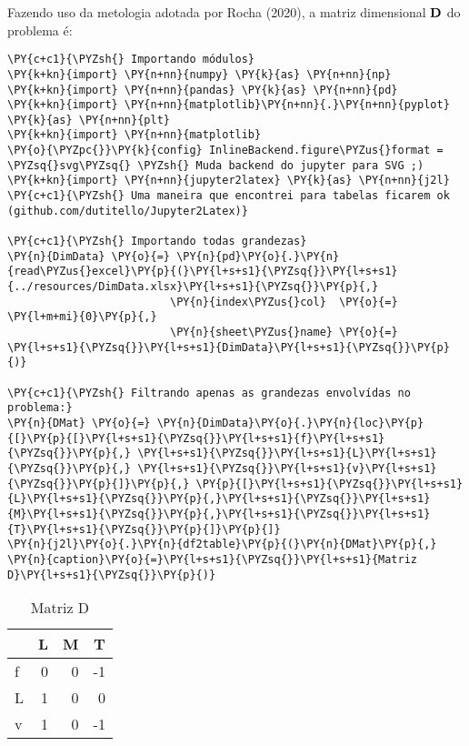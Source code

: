     Fazendo uso da metologia adotada por Rocha (2020), a matriz dimensional
\(\bf D\) do problema é:

    \begin{tcolorbox}[breakable, size=fbox, boxrule=1pt, pad at break*=1mm,colback=cellbackground, colframe=cellborder]
\begin{Verbatim}[commandchars=\\\{\}]
\PY{c+c1}{\PYZsh{} Importando módulos}
\PY{k+kn}{import} \PY{n+nn}{numpy} \PY{k}{as} \PY{n+nn}{np}
\PY{k+kn}{import} \PY{n+nn}{pandas} \PY{k}{as} \PY{n+nn}{pd} 
\PY{k+kn}{import} \PY{n+nn}{matplotlib}\PY{n+nn}{.}\PY{n+nn}{pyplot} \PY{k}{as} \PY{n+nn}{plt}
\PY{k+kn}{import} \PY{n+nn}{matplotlib}
\PY{o}{\PYZpc{}}\PY{k}{config} InlineBackend.figure\PYZus{}format = \PYZsq{}svg\PYZsq{} \PYZsh{} Muda backend do jupyter para SVG ;)
\PY{k+kn}{import} \PY{n+nn}{jupyter2latex} \PY{k}{as} \PY{n+nn}{j2l} \PY{c+c1}{\PYZsh{} Uma maneira que encontrei para tabelas ficarem ok (github.com/dutitello/Jupyter2Latex)}

\PY{c+c1}{\PYZsh{} Importando todas grandezas}
\PY{n}{DimData} \PY{o}{=} \PY{n}{pd}\PY{o}{.}\PY{n}{read\PYZus{}excel}\PY{p}{(}\PY{l+s+s1}{\PYZsq{}}\PY{l+s+s1}{../resources/DimData.xlsx}\PY{l+s+s1}{\PYZsq{}}\PY{p}{,} 
                         \PY{n}{index\PYZus{}col}  \PY{o}{=}  \PY{l+m+mi}{0}\PY{p}{,}
                         \PY{n}{sheet\PYZus{}name} \PY{o}{=} \PY{l+s+s1}{\PYZsq{}}\PY{l+s+s1}{DimData}\PY{l+s+s1}{\PYZsq{}}\PY{p}{)}

\PY{c+c1}{\PYZsh{} Filtrando apenas as grandezas envolvídas no problema:}
\PY{n}{DMat} \PY{o}{=} \PY{n}{DimData}\PY{o}{.}\PY{n}{loc}\PY{p}{[}\PY{p}{[}\PY{l+s+s1}{\PYZsq{}}\PY{l+s+s1}{f}\PY{l+s+s1}{\PYZsq{}}\PY{p}{,} \PY{l+s+s1}{\PYZsq{}}\PY{l+s+s1}{L}\PY{l+s+s1}{\PYZsq{}}\PY{p}{,} \PY{l+s+s1}{\PYZsq{}}\PY{l+s+s1}{v}\PY{l+s+s1}{\PYZsq{}}\PY{p}{]}\PY{p}{,} \PY{p}{[}\PY{l+s+s1}{\PYZsq{}}\PY{l+s+s1}{L}\PY{l+s+s1}{\PYZsq{}}\PY{p}{,}\PY{l+s+s1}{\PYZsq{}}\PY{l+s+s1}{M}\PY{l+s+s1}{\PYZsq{}}\PY{p}{,}\PY{l+s+s1}{\PYZsq{}}\PY{l+s+s1}{T}\PY{l+s+s1}{\PYZsq{}}\PY{p}{]}\PY{p}{]}
\PY{n}{j2l}\PY{o}{.}\PY{n}{df2table}\PY{p}{(}\PY{n}{DMat}\PY{p}{,} \PY{n}{caption}\PY{o}{=}\PY{l+s+s1}{\PYZsq{}}\PY{l+s+s1}{Matriz D}\PY{l+s+s1}{\PYZsq{}}\PY{p}{)}
\end{Verbatim}
\end{tcolorbox}

    
    \begin{table}[h!]
    \centering
    \caption{Matriz D}
    {\begin{tabular}{lrrr}
\toprule
{} &  L &  M &  T \\
\midrule
f &  0 &  0 & -1 \\
L &  1 &  0 &  0 \\
v &  1 &  0 & -1 \\
\bottomrule
\end{tabular}
}
    \label{}
    \end{table}
    

